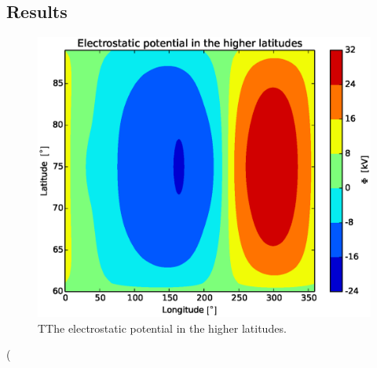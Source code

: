 \documentclass[x11names]{article}
\begin{document}
\subsection{Results}

  \begin{figure}
    \centering
    \includegraphics[scale = 0.5]{../source/potential}   
    \caption{TThe electrostatic potential in the higher latitudes.}
    \label{fig:potential}   
  \end{figure}

      

\appendix(
\end{document}
